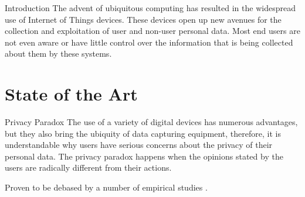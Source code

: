 \documentclass[xcolor={svgnames},compress,aspectratio=169]{beamer}
\begin{document}

\begin{frame}{Introduction}
    The advent of ubiquitous computing has resulted in the widespread use of
    Internet of Things devices. These devices open up
    new avenues for the collection and exploitation of user and non-user personal
    data. Most end users are not even aware or have little control over the
    information that is being collected about them by these systems.

\end{frame}


\section{State of the Art}

\begin{frame}{Privacy Paradox}
    \vspace*{\fill}
    The use of a variety of digital devices has numerous advantages, but
    they also bring the ubiquity of data capturing equipment, therefore,
    it is understandable why users have serious concerns about the privacy
    of their personal data. The privacy paradox happens when the opinions
    stated by the users are radically different from their actions.

    \vspace*{\fill}
    Proven to be debased by a number of empirical studies \cite{sannon2018privacy,xie2019consumers}.
    \vspace*{\fill}
\end{frame}

\end{document}
